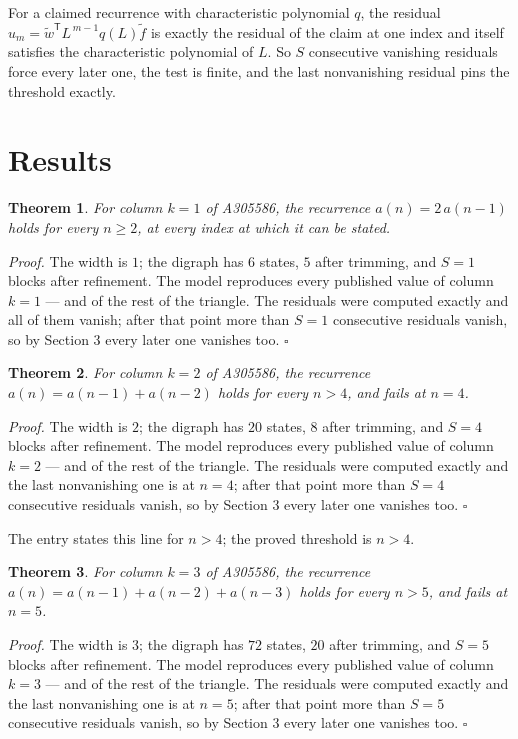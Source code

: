 \documentclass[11pt]{article}
\newtheorem{theorem}{Theorem}
\theoremstyle{definition}
\begin{document}
For a claimed recurrence with characteristic polynomial $q$, the residual $u_m = \tilde w^{\mathsf T}L^{\,m-1}q(L)\tilde f$ is exactly the residual of the claim at one index and itself satisfies the characteristic polynomial of $L$. So $S$ consecutive vanishing residuals force every later one, the test is finite, and the last nonvanishing residual pins the threshold exactly.

\section{Results}

\begin{theorem} For column $k = 1$ of A305586, the recurrence $a(n) = 2\,a(n-1)$ holds for every $n \ge 2$, at every index at which it can be stated.\end{theorem}

{\itshape Proof.} The width is $1$; the digraph has $6$ states, $5$ after trimming, and $S = 1$ blocks after refinement. The model reproduces every published value of column $k = 1$ --- and of the rest of the triangle. The residuals were computed exactly and all of them vanish; after that point more than $S = 1$ consecutive residuals vanish, so by Section 3 every later one vanishes too. $\square$

\begin{theorem} For column $k = 2$ of A305586, the recurrence $a(n) = a(n-1) + a(n-2)$ holds for every $n > 4$, and fails at $n = 4$.\end{theorem}

{\itshape Proof.} The width is $2$; the digraph has $20$ states, $8$ after trimming, and $S = 4$ blocks after refinement. The model reproduces every published value of column $k = 2$ --- and of the rest of the triangle. The residuals were computed exactly and the last nonvanishing one is at $n = 4$; after that point more than $S = 4$ consecutive residuals vanish, so by Section 3 every later one vanishes too. $\square$

The entry states this line for $n > 4$; the proved threshold is $n > 4$.

\begin{theorem} For column $k = 3$ of A305586, the recurrence $a(n) = a(n-1) + a(n-2) + a(n-3)$ holds for every $n > 5$, and fails at $n = 5$.\end{theorem}

{\itshape Proof.} The width is $3$; the digraph has $72$ states, $20$ after trimming, and $S = 5$ blocks after refinement. The model reproduces every published value of column $k = 3$ --- and of the rest of the triangle. The residuals were computed exactly and the last nonvanishing one is at $n = 5$; after that point more than $S = 5$ consecutive residuals vanish, so by Section 3 every later one vanishes too. $\square$
\end{document}
